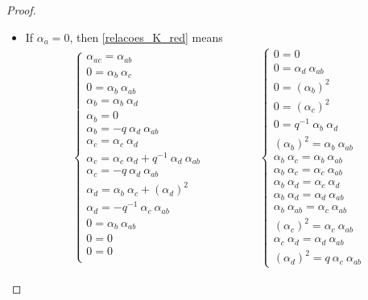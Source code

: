\documentclass[reqno]{amsart}
\theoremstyle{definition}
\numberwithin{equation}{section}\theoremstyle{plain}
\theoremstyle{definition}
\begin{document}
\begin{proof}
\begin{itemize}
    \item If $\alpha_a=0$, then \eqref{relacoes_K_red} means
\begin{align*}
\left\{
\begin{array}{lll}
\alpha_{ac} = \alpha_{ab} \\
0 = \alpha_{b} \ \alpha_{c} \\
0 = \alpha_{b} \ \alpha_{ab} \\
\alpha_{b} = \alpha_{b} \ \alpha_{d} \\
\alpha_{b} = 0 \\
\alpha_{b} =  - q \ \alpha_{d} \ \alpha_{ab} \\
\alpha_{c} = \alpha_{c} \ \alpha_{d} \\
\alpha_{c} = \alpha_{c} \ \alpha_{d} + q^{-1} \ \alpha_{d} \ \alpha_{ab} \\
\alpha_{c} = - q \ \alpha_{d} \ \alpha_{ab} \\
\alpha_{d} = \alpha_{b} \ \alpha_{c} + (\alpha_{d})^2 \\
\alpha_{d} = - q^{-1} \ \alpha_{c} \ \alpha_{ab} \\
0 = \alpha_{b} \ \alpha_{ab} \\
0 = 0 \\
0 = 0 \\
\end{array} 
\right.
& \qquad \qquad 
\left\{
\begin{array}{lll}
0 = 0 \\
0 = \alpha_{d} \ \alpha_{ab} \\
0 = (\alpha_{b})^2\\
0 = (\alpha_{c})^2\\
0 = q^{-1} \ \alpha_{b} \ \alpha_{d}\\
(\alpha_{b})^2 = \alpha_{b} \ \alpha_{ab} \\
\alpha_{b} \ \alpha_{c} = \alpha_{b} \ \alpha_{ab} \\
\alpha_{b} \ \alpha_{c} = \alpha_{c} \ \alpha_{ab} \\
\alpha_{b} \ \alpha_{d} = \alpha_{c} \ \alpha_{d} \\
\alpha_{b} \ \alpha_{d} = \alpha_{d} \ \alpha_{ab} \\
\alpha_{b} \ \alpha_{ab} = \alpha_{c} \ \alpha_{ab} \\
(\alpha_{c})^2 = \alpha_{c} \ \alpha_{ab} \\
\alpha_{c} \ \alpha_{d} = \alpha_{d} \ \alpha_{ab} \\
(\alpha_{d})^2 = q \ \alpha_{c} \ \alpha_{ab}

\end{array}
\end{align*}
\end{itemize}
\end{proof}
\end{document}
